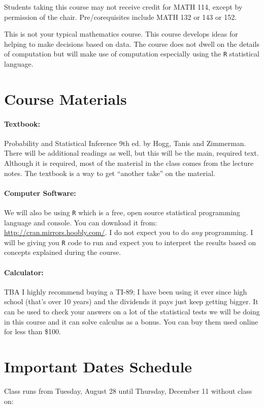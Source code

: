 \documentclass[12pt]{article}
\begin{document}
Students taking this course may not receive credit for MATH 114, except by permission of the chair. Pre/corequisites include MATH 132 or 143 or 152.

This is not your typical mathematics course. This course develops ideas for helping to make decisions based on data. The course does not dwell on the details of computation but will make use of computation especially using the \texttt{R} statistical language.

\section*{Course Materials}

\paragraph{Textbook:} Probability and Statistical Inference 9th ed. by Hogg, Tanis and Zimmerman. There will be additional readings as well, but this will be the main, required text. Although it is required, most of the material in the class comes from the lecture notes. The textbook is a way to get ``another take'' on the material.
\paragraph{Computer Software:} We will also be using \texttt{R} which is a free, open source statistical programming language and console. You can download it from: \url{http://cran.mirrors.hoobly.com/}. I do not expect you to do \textit{any} programming. I will be giving you \texttt{R} code to run and expect you to interpret the results based on concepts explained during the course.
\paragraph{Calculator:} TBA I highly recommend buying a TI-89; I have been using it ever since high school (that's over 10 years) and the dividends it pays just keep getting bigger. It can be used to check your answers on a lot of the statistical tests we will be doing in this course and it can solve calculus as a bonus. You can buy them used online for less than \$100.

\section*{Important Dates Schedule}

Class runs from Tuesday, August 28 until Thursday, December 11 without class on:
\end{document}
